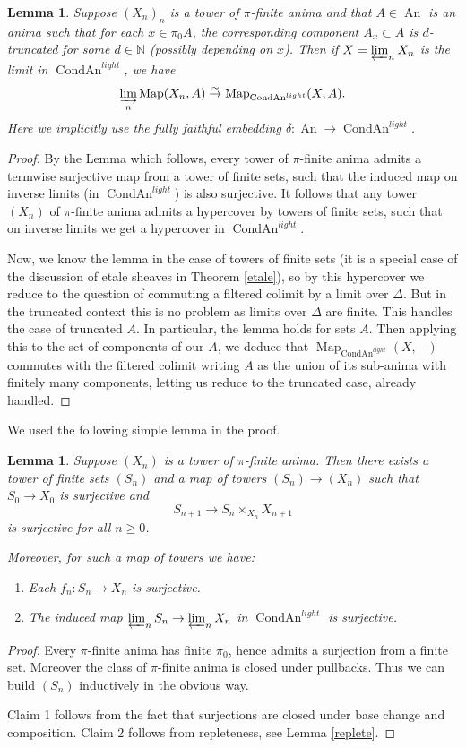 \documentclass[12pt]{article}
\newtheorem{lemma}[theorem]{Lemma}
\newcommand{\on}{\operatorname}
\begin{document}
\begin{lemma}\label{mapoutofprof}
Suppose $(X_n)_n$ is a tower of $\pi$-finite anima and that $A\in\on{An}$ is an anima such that for each $x\in \pi_0A$, the corresponding component $A_x\subset A$ is $d$-truncated for some $d\in\mathbb{N}$ (possibly depending on $x$).  Then if $X=\varprojlim_n X_n$ is the limit in $\on{CondAn}^{light}$, we have
$$\varinjlim_n \on{Map}(X_n,A)\overset{\sim}{\rightarrow}\on{Map}_{\on{CondAn}^{light}}(X,A).$$
Here we implicitly use the fully faithful embedding $\delta:\on{An}\rightarrow\on{CondAn}^{light}$.
\end{lemma}
\begin{proof}
By the Lemma which follows, every tower of $\pi$-finite anima admits a termwise surjective map from a tower of finite sets, such that the induced map on inverse limits (in $\on{CondAn}^{light}$) is also surjective.  It follows that any tower $(X_n)$ of $\pi$-finite anima admits a hypercover by towers of finite sets, such that on inverse limits we get a hypercover in $\on{CondAn}^{light}$.

Now, we know the lemma in the case of towers of finite sets (it is a special case of the discussion of etale sheaves in Theorem \ref{etale}), so by this hypercover we reduce to the question of commuting a filtered colimit by a limit over $\Delta$.  But in the truncated context this is no problem as limits over $\Delta$ are finite.  This handles the case of truncated $A$.  In particular, the lemma holds for sets $A$.  Then applying this to the set of components of our $A$, we deduce that $\on{Map}_{\on{CondAn}^{light}}(X,-)$ commutes with the filtered colimit writing $A$ as the union of its sub-anima with finitely many components, letting us reduce to the truncated case, already handled.
\end{proof}

We used the following simple lemma in the proof.

\begin{lemma}\label{surjectfromprofset}
Suppose $(X_n)$ is a tower of $\pi$-finite anima.  Then there exists a tower of finite sets $(S_n)$ and a map of towers $(S_n)\to (X_n)$ such that $S_0\to X_0$ is surjective and
$$S_{n+1} \to S_n\times_{X_n} X_{n+1}$$
is surjective for all $n\geq 0$.

Moreover, for such a map of towers we have:
\begin{enumerate}
\item Each $f_n:S_n\to X_n$ is surjective.
\item The induced map $\varprojlim_n S_n \to \varprojlim_n X_n$ in $\on{CondAn}^{light}$ is surjective.
\end{enumerate}
\end{lemma}
\begin{proof}
Every $\pi$-finite anima has finite $\pi_0$, hence admits a surjection from a finite set.  Moreover the class of $\pi$-finite anima is closed under pullbacks.  Thus we can build $(S_n)$ inductively in the obvious way.

Claim 1 follows from the fact that surjections are closed under base change and composition.  Claim 2 follows from repleteness, see Lemma \ref{replete}.
\end{proof}
\end{document}
